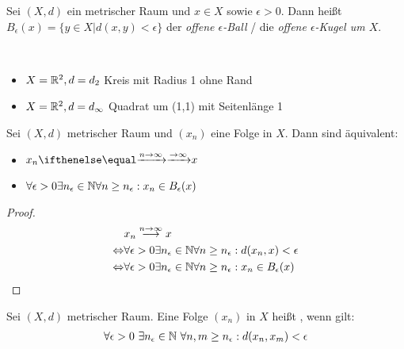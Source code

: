 \begin{Definition}%
	Sei $(X,d)$ ein metrischer Raum und $x \in X$ sowie $\epsilon > 0$. Dann heißt 
	$B_\epsilon (x) = \{ y \in X \vert d(x,y) < \epsilon\}$ der \emph{offene 
	$\epsilon$-Ball} / die \emph{offene $\epsilon$-Kugel um $X$}.
\end{Definition}

\begin{Beispiel}~
	\begin{itemize}
		\item $X = \mathbb{R}^2, d = d_2$ Kreis mit Radius 1 ohne Rand
		\item $X = \mathbb{R}^2, d = d_\infty$ Quadrat um (1,1) mit Seitenlänge 1
	\end{itemize}
\end{Beispiel}

\begin{Lemma}{\label{vl_21_lemma_2}%
	Sei $(X,d)$ metrischer Raum und $(x_n)$ eine Folge in $X$. Dann sind äquivalent:
	\begin{itemize}
		\item $x_n \toinfty x$
		\item $\forall \epsilon > 0 \exists n_\epsilon \in \mathbb{N} \forall n \geq n_\epsilon  
			: x_n \in B_\epsilon (x)$
	\end{itemize}
}\end{Lemma}

\begin{proof}
	\begin{align*}
		& x_n \overset{n\rightarrow \infty}{\longrightarrow} x \\
		\Leftrightarrow & \forall \epsilon > 0 
			\exists n_\epsilon \in \mathbb{N} \forall n \geq n_\epsilon: 
			d(x_n,x) < \epsilon \\
		\Leftrightarrow & \forall \epsilon > 0 \exists n_\epsilon \in \mathbb{N} \forall n \geq 
	n_\epsilon: x_n \in B_\epsilon(x)
	\end{align*} 
\end{proof}

\begin{Definition}[Einschub]
	Sei $(X,d)$ metrischer Raum. Eine Folge $(x_n)$ in $X$ heißt , wenn gilt: 
	\begin{align*}
	\forall \epsilon > 0 \text{ } \exists n_\epsilon \in \mathbb{N} \text{ } \forall n, m 
		\geq n_\epsilon: d(x_n,x_m) < \epsilon
	\end{align*}
\end{Definition}
